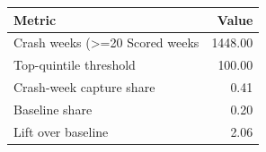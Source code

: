 \begin{tabular}{lr}
\toprule
Metric & Value \\
\midrule
Crash weeks (>=20%
Scored weeks & 1448.00 \\
Top-quintile threshold & 100.00 \\
Crash-week capture share & 0.41 \\
Baseline share & 0.20 \\
Lift over baseline & 2.06 \\
\bottomrule
\end{tabular}
